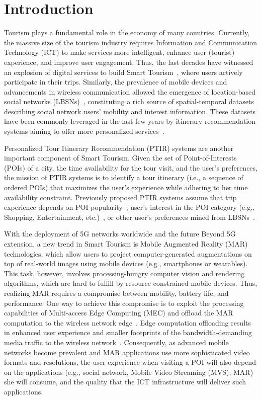 \section{Introduction}\label{introduction}

Tourism plays a fundamental role in the economy of many countries. Currently, the massive size of the tourism industry requires Information and Communication Technology (ICT) to make services more intelligent, enhance user (tourist) experience, and improve user engagement. Thus, the last decades have witnessed an explosion of digital services to build Smart Tourism~\cite{eu-capital:23}{,} where users actively participate in their trips. Similarly, the prevalence of mobile devices and advancements in wireless communication allowed the emergence of location-based social networks (LBSNs)~\cite{silva-urban:19}, constituting a rich source of spatial-temporal datasets describing social network users' mobility and interest information. These datasets have been commonly leveraged in the last few years by itinerary recommendation systems aiming to offer more personalized services~\cite{lim-tour:18, shini-extensive:20, yochum-linked:20,halder-survey:24}. 

Personalized Tour Itinerary Recommendation (PTIR) systems are another important component of Smart Tourism. Given the set of Point-of-Interests (POIs) of a city, the time availability for the tour visit, and the user's preferences, the mission of PTIR systems is to identify a tour itinerary (i.e., a sequence of ordered POIs) that maximizes the user's experience while adhering to her time availability constraint. Previously proposed PTIR systems assume that trip experience depends on POI popularity~\cite{choudhury-automatic:10}, user's interest in the POI category (e.g., Shopping, Entertainment, etc.)~\cite{brilhante-where:13, yu-personalized:16, lim-personalized:18}, or other user's preferences mined from LBSNs~\cite{chen-persolnalized:20, chen-trip:23}.

With the deployment of 5G networks worldwide and the future Beyond 5G extension, a new trend in Smart Tourism is Mobile Augmented Reality (MAR) technologies, which allow users to project computer-generated augmentations on top of real-world images using mobile devices (e.g., smartphones or wearables). This task, however, involves processing-hungry computer vision and rendering algorithms, which are hard to fulfill by resource-constrained mobile devices. Thus, realizing MAR requires a compromise between mobility, battery life, and performance. One way to achieve this compromise is to exploit the processing capabilities of Multi-access Edge Computing (MEC) and offload the MAR computation to the wireless network edge~\cite{chen-empirical:17,zhou-5g:24}. Edge computation offloading results in enhanced user experience and smaller footprints of the bandwidth-demanding media traffic to the wireless network~\cite{siriwardhana-survey:21}. Consequently, as advanced mobile networks become prevalent and MAR applications use more sophisticated video formats and resolutions, the user experience when visiting a POI will also depend on the applications (e.g., social network, Mobile Video Streaming (MVS), MAR) she will consume, and the quality that the ICT infrastructure will deliver such applications.


